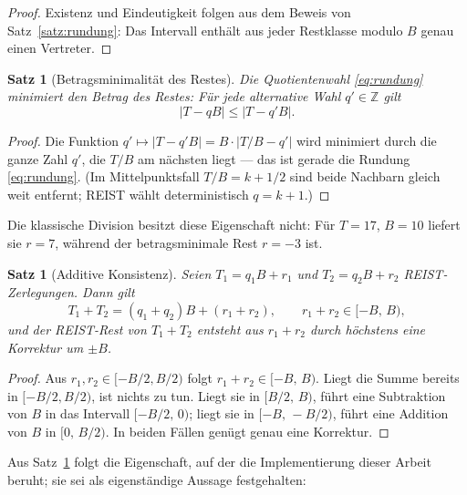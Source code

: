 \documentclass[11pt,a4paper]{scrartcl}
\theoremstyle{definition}
\theoremstyle{plain}
\newtheorem{satz}[definition]{Satz}
\theoremstyle{remark}
\newcommand{\Z}{\mathbb{Z}}
\begin{document}
\begin{proof}
Existenz und Eindeutigkeit folgen aus dem Beweis von Satz~\ref{satz:rundung}: Das Intervall enthält aus jeder Restklasse modulo $B$ genau einen Vertreter.
\end{proof}

\begin{satz}[Betragsminimalität des Restes]
\label{satz:minimal}
Die Quotientenwahl \eqref{eq:rundung} minimiert den Betrag des Restes: Für jede alternative Wahl $q' \in \Z$ gilt
\begin{equation}
|T - qB| \le |T - q'B|.
\end{equation}
\end{satz}

\begin{proof}
Die Funktion $q' \mapsto |T - q'B| = B \cdot |T/B - q'|$ wird minimiert durch die ganze Zahl $q'$, die $T/B$ am nächsten liegt --- das ist gerade die Rundung \eqref{eq:rundung}. (Im Mittelpunktsfall $T/B = k + 1/2$ sind beide Nachbarn gleich weit entfernt; REIST wählt deterministisch $q = k+1$.)
\end{proof}

Die klassische Division besitzt diese Eigenschaft nicht: Für $T = 17$, $B = 10$ liefert sie $r = 7$, während der betragsminimale Rest $r = -3$ ist.

\begin{satz}[Additive Konsistenz]
\label{satz:additiv}
Seien $T_1 = q_1 B + r_1$ und $T_2 = q_2 B + r_2$ REIST-Zerlegungen. Dann gilt
\begin{equation}
T_1 + T_2 = (q_1 + q_2)B + (r_1 + r_2), \qquad r_1 + r_2 \in [-B,\, B),
\end{equation}
und der REIST-Rest von $T_1 + T_2$ entsteht aus $r_1 + r_2$ durch höchstens eine Korrektur um $\pm B$.
\end{satz}

\begin{proof}
Aus $r_1, r_2 \in [-B/2, B/2)$ folgt $r_1 + r_2 \in [-B,\, B)$. Liegt die Summe bereits in $[-B/2, B/2)$, ist nichts zu tun. Liegt sie in $[B/2,\, B)$, führt eine Subtraktion von $B$ in das Intervall $[-B/2,\, 0)$; liegt sie in $[-B,\, -B/2)$, führt eine Addition von $B$ in $[0,\, B/2)$. In beiden Fällen genügt genau eine Korrektur.
\end{proof}

Aus Satz~\ref{satz:additiv} folgt die Eigenschaft, auf der die Implementierung dieser Arbeit beruht; sie sei als eigenständige Aussage festgehalten:
\end{document}
